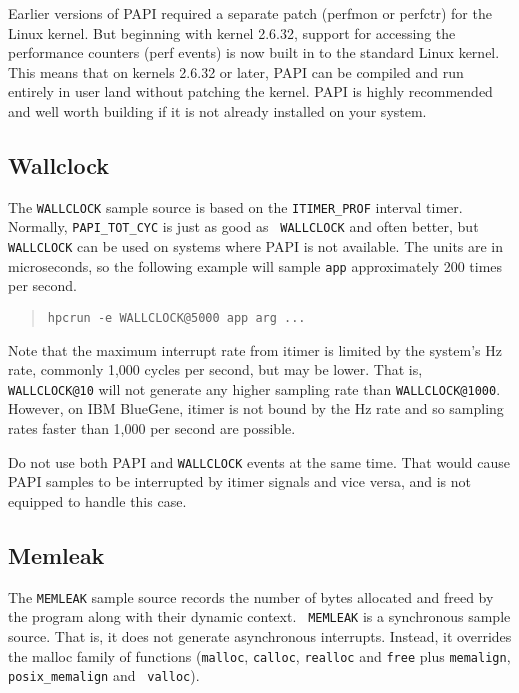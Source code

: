 Earlier versions of PAPI required a separate patch (perfmon or
perfctr) for the Linux kernel.  But beginning with kernel 2.6.32,
support for accessing the performance counters (perf events) is now
built in to the standard Linux kernel.  This means that on kernels
2.6.32 or later, PAPI can be compiled and run entirely in user land
without patching the kernel.  PAPI is highly recommended and well
worth building if it is not already installed on your system.

\subsection{Wallclock}

The {\tt WALLCLOCK} sample source is based on the \verb|ITIMER_PROF|
interval timer.  Normally, \verb|PAPI_TOT_CYC| is just as good as {\tt
WALLCLOCK} and often better, but {\tt WALLCLOCK} can be used on
systems where PAPI is not available.  The units are in microseconds,
so the following example will sample {\tt app} approximately 200
times per second.

\begin{quote}
\begin{verbatim}
hpcrun -e WALLCLOCK@5000 app arg ...
\end{verbatim}
\end{quote}

Note that the maximum interrupt rate from itimer is limited by the
system's Hz rate, commonly 1,000 cycles per second, but may be lower.
That is, {\tt WALLCLOCK@10} will not generate any higher sampling rate
than {\tt WALLCLOCK@1000}.  However, on IBM BlueGene, itimer is not
bound by the Hz rate and so sampling rates faster than 1,000 per
second are possible.

Do not use both PAPI and {\tt WALLCLOCK} events at the same time.
That would cause PAPI samples to be interrupted by itimer signals and
vice versa, and \hpcrun{} is not equipped to handle this case.

\subsection{Memleak}

The {\tt MEMLEAK} sample source records the number of bytes allocated
and freed by the program along with their dynamic context.  {\tt
MEMLEAK} is a synchronous sample source.  That is, it does not
generate asynchronous interrupts.  Instead, it overrides the malloc
family of functions ({\tt malloc}, {\tt calloc}, {\tt realloc} and
{\tt free} plus {\tt memalign}, {\tt posix\_memalign} and {\tt
valloc}).

